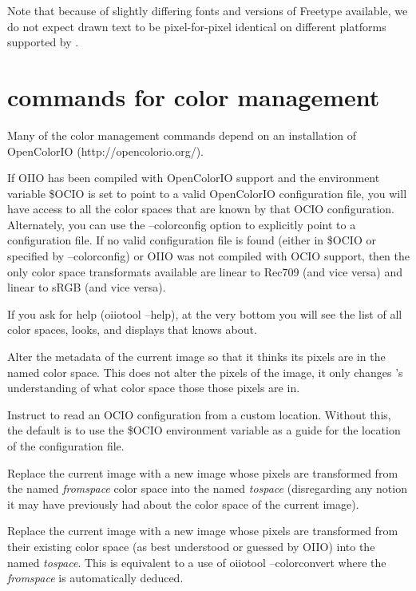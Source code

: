\noindent Note that because of slightly differing fonts and versions of
Freetype available, we do not expect drawn text to be pixel-for-pixel 
identical on different platforms supported by \product.
\apiend



\section{\oiiotool commands for color management}

Many of the color management commands depend on an installation of
OpenColorIO ({\cf http://opencolorio.org/}).

If OIIO has been compiled with OpenColorIO support and the environment
variable {\cf \$OCIO} is set to point to a valid OpenColorIO configuration
file, you will have access to all the color spaces that are known by that
OCIO configuration.  Alternately, you can use the {\cf --colorconfig} option
to explicitly point to a configuration file. If no  valid configuration file
is found (either in {\cf \$OCIO} or specified by {\cf --colorconfig}) or
OIIO was not compiled with OCIO support, then the only color space
transformats available are {\cf linear} to {\cf Rec709} (and vice versa) and
{\cf linear} to {\cf sRGB} (and vice versa).

If you ask for \oiiotool help ({\cf oiiotool --help}), at the very bottom
you will see the list of all color spaces, looks, and displays that
\oiiotool knows about.

Alter the metadata of the current image so that it thinks its pixels
are in the named color space.  This does not alter the pixels of the
image, it only changes \oiiotool's understanding of what color
space those those pixels are in.
\apiend

Instruct \oiiotool to read an OCIO configuration from a custom location.
Without this, the default is to use the {\cf \$OCIO} environment variable
as a guide for the location of the configuration file.
\apiend

Replace the current image with a new image whose pixels are transformed
from the named \emph{fromspace} color space into the named
\emph{tospace} (disregarding any notion it may have previously had 
about the color space of the current image).  
\apiend

Replace the current image with a new image whose pixels are transformed
from their existing color space (as best understood or guessed by OIIO)
into the named \emph{tospace}.  This is equivalent to a use of
{\cf oiiotool --colorconvert} where the \emph{fromspace} is
automatically deduced.
\apiend

